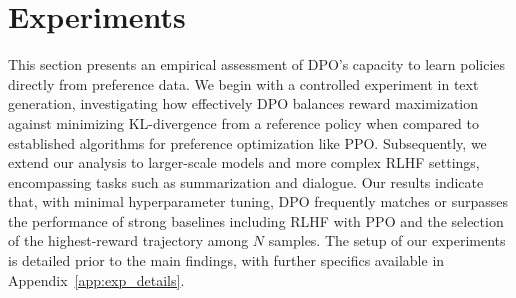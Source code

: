 \section{Experiments}
This section presents an empirical assessment of DPO's capacity to learn policies directly from preference data. We begin with a controlled experiment in text generation, investigating how effectively DPO balances reward maximization against minimizing KL-divergence from a reference policy when compared to established algorithms for preference optimization like PPO. Subsequently, we extend our analysis to larger-scale models and more complex RLHF settings, encompassing tasks such as summarization and dialogue. Our results indicate that, with minimal hyperparameter tuning, DPO frequently matches or surpasses the performance of strong baselines including RLHF with PPO and the selection of the highest-reward trajectory among $N$ samples. The setup of our experiments is detailed prior to the main findings, with further specifics available in Appendix~\ref{app:exp_details}.


